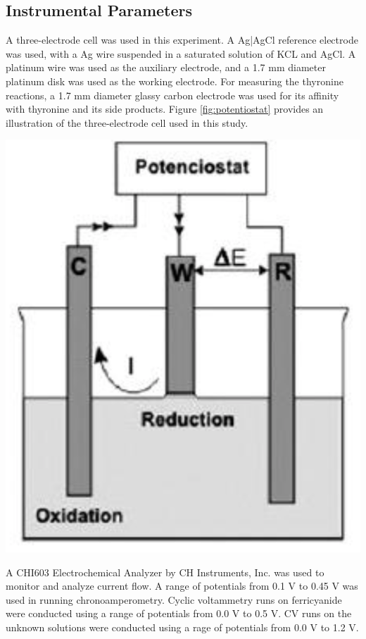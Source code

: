 \documentclass{article}
\begin{document}
\begin{multicols}{2}
{\subsection*{Instrumental Parameters}
A three-electrode cell was used in this experiment.
A Ag|AgCl reference electrode was used, with a Ag wire suspended in a saturated
solution of KCL and AgCl. A platinum wire was used as the auxiliary electrode,
and a 1.7 mm diameter platinum disk was used as the working electrode.
For measuring the thyronine reactions, a 1.7 mm diameter glassy carbon
electrode was used for its affinity with thyronine and its side products.
Figure \ref{fig:potentiostat} provides an illustration of the
three-electrode cell used in this study.
\begin{center}
    \includegraphics[scale=0.3]{potentiostat}
    \label{fig:potentiostat}
\end{center}

A CHI603 Electrochemical Analyzer by CH Instruments, Inc. was used to
monitor and analyze current flow.
A range of potentials from 0.1 V to 0.45 V was used in running
chronoamperometry.
Cyclic voltammetry runs on ferricyanide were conducted using a range of potentials from 0.0 V to
0.5 V.
CV runs on the unknown solutions were conducted using a rage of potentials from
0.0 V to 1.2 V.

}
\end{multicols}
\end{document}
